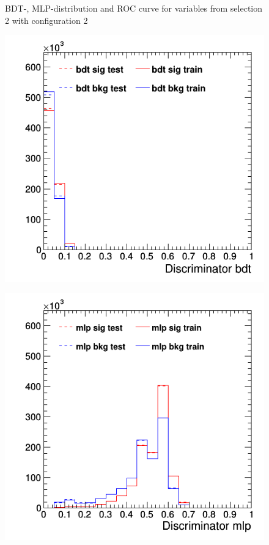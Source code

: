\documentclass[11pt]{scrartcl}
\begin{document}
\begin{figure}[H]
	\caption{BDT-, MLP-distribution and ROC curve for variables from selection 2 with configuration 2}
	 \label{fig:ROC_s2_config2}	
	\end{figure}
	
	\begin{figure}[H]
	\centering
	\begin{minipage}{.5\textwidth}
	  \centering
	  \includegraphics[width=0.75\linewidth]{figures/MVA/select2/config3/discriminator_bdt.png}
	  \label{fig:distr_s2_config3_bdt}
	\end{minipage}%
	\begin{minipage}{.5\textwidth}
	  \centering
	  \includegraphics[width=0.75\linewidth]{figures/MVA/select2/config3/discriminator_mlp.png}

\end{minipage}
\end{figure}
\end{document}
